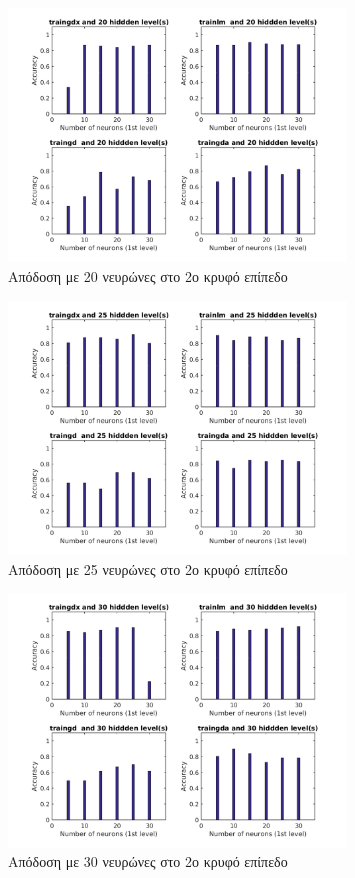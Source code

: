 \documentclass[12pt]{article}
\begin{document}
		\begin{figure}[H]
	 		\centering
			\includegraphics[width=0.8\textwidth]{fakelos/NNlvls-20.png}
			\caption{Απόδοση με 20 νευρώνες στο 2ο κρυφό επίπεδο} 	  
			\label{fig:2.NN-lvls20}
		\end{figure}
		
		\begin{figure}[H]
	 		\centering
			\includegraphics[width=0.8\textwidth]{fakelos/NNlvls-25.png}
			\caption{Απόδοση με 25 νευρώνες στο 2ο κρυφό επίπεδο} 	  
			\label{fig:2.NN-lvls25}
		\end{figure}
		
		\begin{figure}[H]
	 		\centering
			\includegraphics[width=0.8\textwidth]{fakelos/NNlvls-30.png}
			\caption{Απόδοση με 30 νευρώνες στο 2ο κρυφό επίπεδο} 	  
			\label{fig:2.NN-lvls30}
		\end{figure}
		
\end{document}
